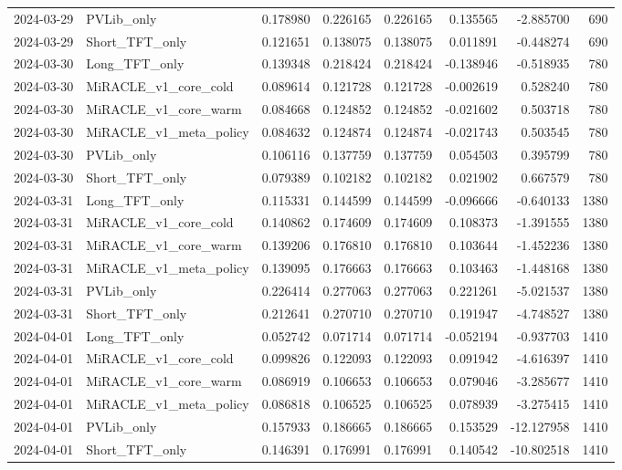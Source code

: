\begin{tabular}{llrrrrrr}
2024-03-29 & PVLib_only & 0.178980 & 0.226165 & 0.226165 & 0.135565 & -2.885700 & 690 \\
2024-03-29 & Short_TFT_only & 0.121651 & 0.138075 & 0.138075 & 0.011891 & -0.448274 & 690 \\
2024-03-30 & Long_TFT_only & 0.139348 & 0.218424 & 0.218424 & -0.138946 & -0.518935 & 780 \\
2024-03-30 & MiRACLE_v1_core_cold & 0.089614 & 0.121728 & 0.121728 & -0.002619 & 0.528240 & 780 \\
2024-03-30 & MiRACLE_v1_core_warm & 0.084668 & 0.124852 & 0.124852 & -0.021602 & 0.503718 & 780 \\
2024-03-30 & MiRACLE_v1_meta_policy & 0.084632 & 0.124874 & 0.124874 & -0.021743 & 0.503545 & 780 \\
2024-03-30 & PVLib_only & 0.106116 & 0.137759 & 0.137759 & 0.054503 & 0.395799 & 780 \\
2024-03-30 & Short_TFT_only & 0.079389 & 0.102182 & 0.102182 & 0.021902 & 0.667579 & 780 \\
2024-03-31 & Long_TFT_only & 0.115331 & 0.144599 & 0.144599 & -0.096666 & -0.640133 & 1380 \\
2024-03-31 & MiRACLE_v1_core_cold & 0.140862 & 0.174609 & 0.174609 & 0.108373 & -1.391555 & 1380 \\
2024-03-31 & MiRACLE_v1_core_warm & 0.139206 & 0.176810 & 0.176810 & 0.103644 & -1.452236 & 1380 \\
2024-03-31 & MiRACLE_v1_meta_policy & 0.139095 & 0.176663 & 0.176663 & 0.103463 & -1.448168 & 1380 \\
2024-03-31 & PVLib_only & 0.226414 & 0.277063 & 0.277063 & 0.221261 & -5.021537 & 1380 \\
2024-03-31 & Short_TFT_only & 0.212641 & 0.270710 & 0.270710 & 0.191947 & -4.748527 & 1380 \\
2024-04-01 & Long_TFT_only & 0.052742 & 0.071714 & 0.071714 & -0.052194 & -0.937703 & 1410 \\
2024-04-01 & MiRACLE_v1_core_cold & 0.099826 & 0.122093 & 0.122093 & 0.091942 & -4.616397 & 1410 \\
2024-04-01 & MiRACLE_v1_core_warm & 0.086919 & 0.106653 & 0.106653 & 0.079046 & -3.285677 & 1410 \\
2024-04-01 & MiRACLE_v1_meta_policy & 0.086818 & 0.106525 & 0.106525 & 0.078939 & -3.275415 & 1410 \\
2024-04-01 & PVLib_only & 0.157933 & 0.186665 & 0.186665 & 0.153529 & -12.127958 & 1410 \\
2024-04-01 & Short_TFT_only & 0.146391 & 0.176991 & 0.176991 & 0.140542 & -10.802518 & 1410 \\

\end{tabular}
